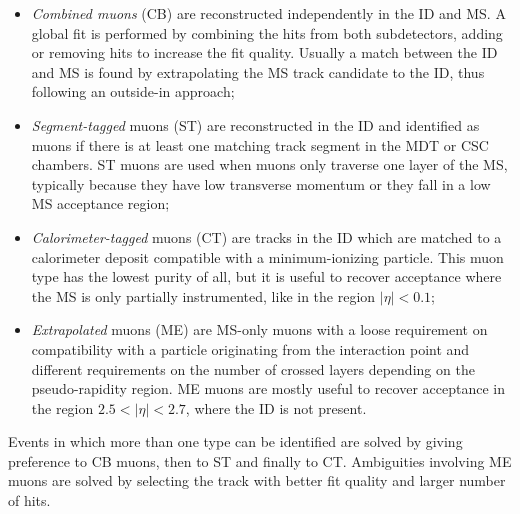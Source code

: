 \documentclass[a4paper,twoside,12pt]{article}
\begin{document}
\begin{itemize}
\item \textit{Combined muons} (CB) are reconstructed independently in the ID and MS.
A global fit is performed by combining the hits from both subdetectors, adding or removing
hits to increase the fit quality. Usually a match between the ID and MS is found by 
extrapolating the MS track candidate to the ID, thus following an outside-in approach;

\item \textit{Segment-tagged} muons (ST) are reconstructed in the ID and identified
as muons if there is at least one matching track segment in the MDT or CSC chambers. ST
muons are used when muons only traverse one layer of the MS, typically because they
have low transverse momentum or they fall in a low MS acceptance region;

\item \textit{Calorimeter-tagged} muons (CT) are tracks in the ID which are matched to
a calorimeter deposit compatible with a minimum-ionizing particle. This muon type has
the lowest purity of all, but it is useful to recover acceptance where the MS is only 
partially instrumented, like in the region $|\eta|  < 0.1$;

\item \textit{Extrapolated} muons (ME) are MS-only muons with a loose requirement
on compatibility with a particle originating from the interaction point and different
requirements on the number of crossed layers depending on the pseudo-rapidity region.
ME muons are mostly useful to recover acceptance in the region $2.5 < |\eta| < 2.7$, where
the ID is not present. 
\end{itemize}

Events in which more than one type can be identified are solved by giving preference
to CB muons, then to ST and finally to CT. Ambiguities involving ME muons are solved
by selecting the track with better fit quality and larger number of hits.
\end{document}
